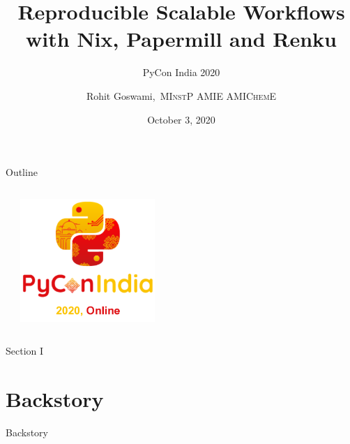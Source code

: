 \documentclass[bigger,unknownkeysallowed,aspectratio=169,red,colorblocks]{beamer}
\author{Rohit Goswami,\textsc{\scriptsize\ MInstP AMIE AMIChemE}}
\date{October 3, 2020}
\title{Reproducible Scalable Workflows with Nix, Papermill and Renku}
\subtitle{PyCon India 2020}
\begin{document}
\maketitle


\begin{frame}[label={sec:org464d316}]{Outline}
\begin{columns}
\begin{column}{0.5\columnwidth}
\tableofcontents
\end{column}
\begin{column}{0.5\columnwidth}
\begin{center}
\includegraphics[width=0.4\textwidth]{images/logos/pyConIN2020.png}
\end{center}
\end{column}
\end{columns}
\end{frame}
\begin{frame}[label={sec:org620b45b},standout]{Section I}
\section{Backstory}
\begin{center}
  \Huge Backstory
\end{center}
\end{frame}
\end{document}
